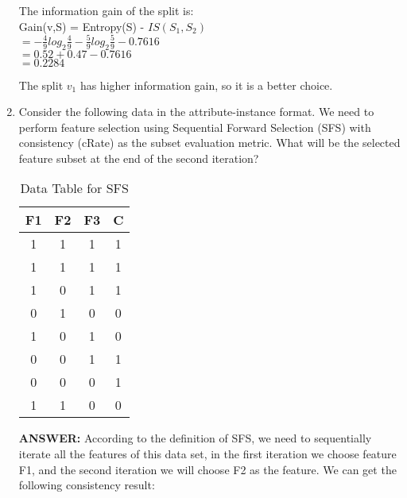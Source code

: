 \documentclass{article}
\begin{document}
\begin{enumerate}
The information gain of the split is: \\ 
Gain(v,S) = Entropy(S) - $IS(S_1,S_2)$ \\ 
$= -\frac{4}{9}log_2\frac{4}{9} - \frac{5}{9}log_2\frac{5}{9} -
0.7616$ \\ 
$= 0.52 + 0.47 - 0.7616$ \\
$= 0.2284$

The split $v_1$ has higher information gain, so it is a better
choice. 

\item Consider the following data in the attribute-instance format. We
need to perform feature selection using Sequential Forward Selection
(SFS) with consistency (cRate) as the subset evaluation metric. What
will be the selected feature subset at the end of the second iteration?
\begin{table}[ht]
  \begin{center}
    \begin{tabular}{| c | c | c || c |}
      \hline F1 & F2 & F3 & C \\
      \hline 1 & 1 & 1 & 1 \\
      \hline 1 & 1 & 1 & 1 \\
      \hline 1 & 0 & 1 & 1 \\
      \hline 0 & 1 & 0 & 0 \\
      \hline 1 & 0 & 1 & 0 \\
      \hline 0 & 0 & 1 & 1 \\
      \hline 0 & 0 & 0 & 1 \\
      \hline 1 & 1 & 0 & 0 \\
      \hline 
    \end{tabular}
    \caption{Data Table for SFS}
  \end{center}
\end{table}

\textbf{ANSWER:} According to the definition of SFS, we need to
sequentially iterate all the features of this data set, in the first
iteration we choose feature F1, and the second iteration we will
choose F2 as the feature. We can get the following consistency result:


\end{enumerate}
\end{document}
